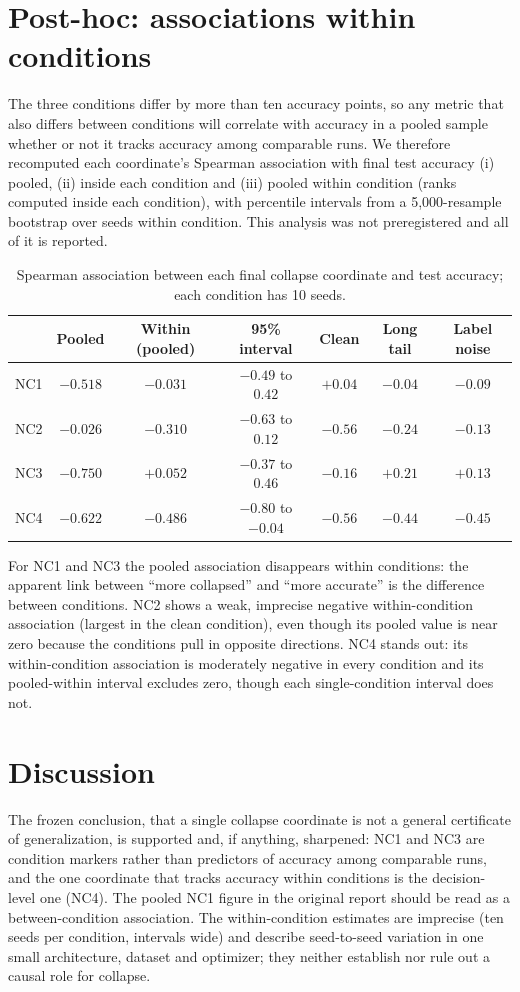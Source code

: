 \documentclass[11pt]{article}
\begin{document}
\section{Post-hoc: associations within conditions}
The three conditions differ by more than ten accuracy points, so any metric that also differs between conditions will correlate with
accuracy in a pooled sample whether or not it tracks accuracy among comparable runs. We therefore recomputed each coordinate's Spearman
association with final test accuracy (i) pooled, (ii) inside each condition and (iii) pooled within condition (ranks computed inside
each condition), with percentile intervals from a 5{,}000-resample bootstrap over seeds within condition. This analysis was not
preregistered and all of it is reported.
\begin{table}[h]
\centering\small
\begin{tabular}{lcccccc}
\toprule
 & Pooled & Within (pooled) & 95\% interval & Clean & Long tail & Label noise\\
\midrule
NC1 & $-0.518$ & $-0.031$ & $-0.49$ to $0.42$ & $+0.04$ & $-0.04$ & $-0.09$\\
NC2 & $-0.026$ & $-0.310$ & $-0.63$ to $0.12$ & $-0.56$ & $-0.24$ & $-0.13$\\
NC3 & $-0.750$ & $+0.052$ & $-0.37$ to $0.46$ & $-0.16$ & $+0.21$ & $+0.13$\\
NC4 & $-0.622$ & $-0.486$ & $-0.80$ to $-0.04$ & $-0.56$ & $-0.44$ & $-0.45$\\
\bottomrule
\end{tabular}
\caption{Spearman association between each final collapse coordinate and test accuracy; each condition has 10 seeds.}
\end{table}
For NC1 and NC3 the pooled association disappears within conditions: the apparent link between ``more collapsed'' and
``more accurate'' is the difference between conditions. NC2 shows a weak, imprecise negative within-condition association
(largest in the clean condition), even though its pooled value is near zero because the conditions pull in opposite directions.
NC4 stands out: its within-condition association is moderately negative in every condition and its pooled-within interval excludes
zero, though each single-condition interval does not.

\section{Discussion}
The frozen conclusion, that a single collapse coordinate is not a general certificate of generalization, is supported and, if
anything, sharpened: NC1 and NC3 are condition markers rather than predictors of accuracy among comparable runs, and the one
coordinate that tracks accuracy within conditions is the decision-level one (NC4). The pooled NC1 figure in the original report should
be read as a between-condition association. The within-condition estimates are imprecise (ten seeds per condition, intervals wide) and
describe seed-to-seed variation in one small architecture, dataset and optimizer; they neither establish nor rule out a causal role
for collapse.
\end{document}
